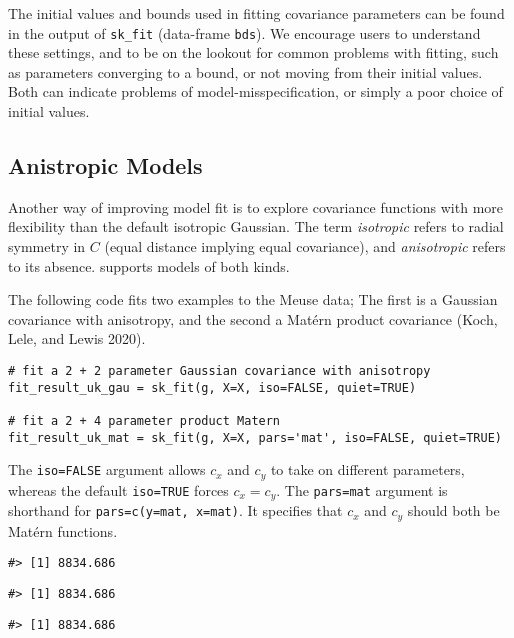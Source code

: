 The initial values and bounds used in fitting covariance parameters can be found in the output of \texttt{sk\_fit} (data-frame \texttt{bds}). We encourage users to understand these settings, and to be on the lookout for common problems with fitting, such as parameters converging to a bound, or not moving from their initial values. Both can indicate problems of model-misspecification, or simply a poor choice of initial values.

\hypertarget{anistropic-models}{%
\subsection{Anistropic Models}\label{anistropic-models}}

Another way of improving model fit is to explore covariance functions with more flexibility than the default isotropic Gaussian. The term \emph{isotropic} refers to radial symmetry in \(C\) (equal distance implying equal covariance), and \emph{anisotropic} refers to its absence.  supports models of both kinds.

The following code fits two examples to the Meuse data; The first is a Gaussian covariance with anisotropy, and the second a Matérn product covariance (Koch, Lele, and Lewis 2020).

\begin{verbatim}
# fit a 2 + 2 parameter Gaussian covariance with anisotropy
fit_result_uk_gau = sk_fit(g, X=X, iso=FALSE, quiet=TRUE)

# fit a 2 + 4 parameter product Matern
fit_result_uk_mat = sk_fit(g, X=X, pars='mat', iso=FALSE, quiet=TRUE)
\end{verbatim}

The \texttt{iso=FALSE} argument allows \(c_x\) and \(c_y\) to take on different parameters, whereas the default \texttt{iso=TRUE} forces \(c_x=c_y\). The \texttt{pars=\textquotesingle{}mat\textquotesingle{}} argument is shorthand for \texttt{pars=c(y=\textquotesingle{}mat\textquotesingle{},\ x=\textquotesingle{}mat\textquotesingle{})}. It specifies that \(c_x\) and \(c_y\) should both be Matérn functions.

\begin{verbatim}
#> [1] 8834.686
\end{verbatim}

\begin{verbatim}
#> [1] 8834.686
\end{verbatim}

\begin{verbatim}
#> [1] 8834.686
\end{verbatim}

